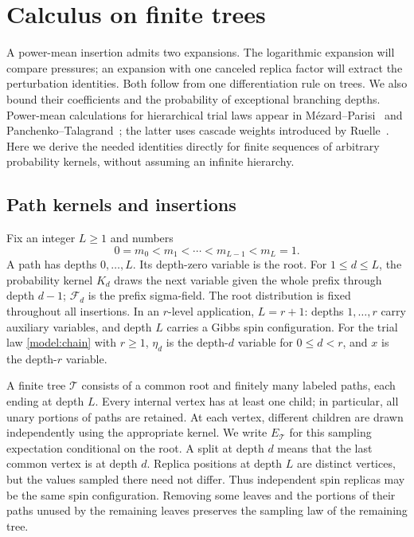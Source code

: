 \section{Calculus on finite trees}\label{tree:section}

A power-mean insertion admits two expansions.  The logarithmic expansion
will compare pressures; an expansion with one canceled replica factor
will extract the perturbation identities.  Both follow from one
differentiation rule on trees.  We also bound their coefficients and the
probability of exceptional branching depths. Power-mean calculations for
hierarchical trial laws appear in M\'ezard--Parisi~\cite[Appendix~A]{MP01}
and Panchenko--Talagrand~\cite[Section~5]{PT04}; the latter uses cascade
weights introduced by Ruelle~\cite{Ruelle87}. Here we derive
the needed identities directly for finite sequences of arbitrary
probability kernels, without assuming an infinite hierarchy.

\subsection{Path kernels and insertions}

Fix an integer $L\geq1$ and numbers
\[
  0=m_0<m_1<\cdots<m_{L-1}<m_L=1.
\]
A path has depths $0,\ldots,L$.  Its depth-zero variable is the root.
For $1\leq d\leq L$, the probability kernel $K_d$ draws the next variable
given the whole prefix through depth $d-1$; $\mathscr F_d$ is the prefix
sigma-field.  The root distribution is fixed throughout all insertions.
In an $r$-level application, $L=r+1$: depths $1,\ldots,r$ carry
auxiliary variables, and depth $L$ carries a Gibbs spin configuration.
For the trial law \eqref{model:chain} with $r\ge1$, $\eta_d$ is the
depth-$d$ variable for $0\le d<r$, and $x$ is the depth-$r$ variable.

A finite tree $\mathcal T$ consists of a common root and finitely many
labeled paths, each ending at depth $L$.  Every internal vertex has at
least one child; in particular, all unary portions of paths are retained.
At each vertex, different children are drawn independently using the
appropriate kernel.  We write $E_{\mathcal T}$ for this sampling
expectation conditional on the root.  A split at depth $d$ means that
the last common vertex is at depth $d$.  Replica positions at depth $L$
are distinct vertices, but the values sampled there need not differ.
Thus independent spin replicas may be the same spin configuration.
Removing some leaves and the portions of their paths unused by the
remaining leaves preserves the sampling law of the remaining tree.

